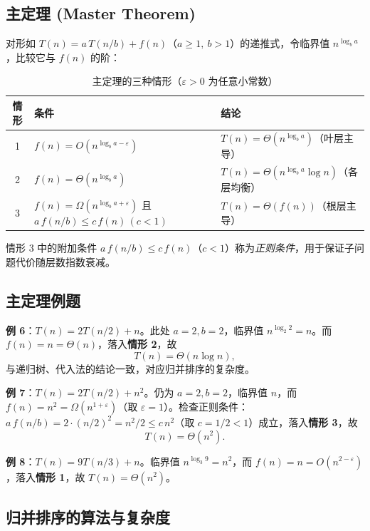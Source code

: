 \subsection{主定理 (Master Theorem)}

对形如 $T(n)=a\,T(n/b)+f(n)$（$a\ge1,\ b>1$）的递推式，令临界值 $n^{\log_b a}$，比较它与 $f(n)$ 的阶：

\begin{table}[H]
\centering
\caption{主定理的三种情形（$\varepsilon>0$ 为任意小常数）}
\label{tab:master}
\begin{tabularx}{\textwidth}{c l X}
\toprule
情形 & 条件 & 结论 \\
\midrule
1 & $f(n)=O(n^{\log_b a-\varepsilon})$ & $T(n)=\Theta(n^{\log_b a})$（叶层主导） \\
2 & $f(n)=\Theta(n^{\log_b a})$ & $T(n)=\Theta(n^{\log_b a}\log n)$（各层均衡） \\
3 & $f(n)=\Omega(n^{\log_b a+\varepsilon})$ 且 $a\,f(n/b)\le c\,f(n)\,(c<1)$ & $T(n)=\Theta(f(n))$（根层主导） \\
\bottomrule
\end{tabularx}
\end{table}

情形 3 中的附加条件 $a\,f(n/b)\le c\,f(n)$（$c<1$）称为\emph{正则条件}，用于保证子问题代价随层数指数衰减。

\subsection{主定理例题}

\textbf{例 6}：$T(n)=2T(n/2)+n$。此处 $a=2,b=2$，临界值 $n^{\log_2 2}=n$。而 $f(n)=n=\Theta(n)$，落入\textbf{情形 2}，故
\begin{equation}
T(n)=\Theta(n\log n),
\end{equation}
与递归树、代入法的结论一致，对应归并排序的复杂度。

\textbf{例 7}：$T(n)=2T(n/2)+n^2$。仍为 $a=2,b=2$，临界值 $n$，而 $f(n)=n^2=\Omega(n^{1+\varepsilon})$（取 $\varepsilon=1$）。检查正则条件：$a\,f(n/b)=2\cdot(n/2)^2=n^2/2\le c\,n^2$（取 $c=1/2<1$）成立，落入\textbf{情形 3}，故
\begin{equation}
T(n)=\Theta(n^2).
\end{equation}

\textbf{例 8}：$T(n)=9T(n/3)+n$。临界值 $n^{\log_3 9}=n^2$，而 $f(n)=n=O(n^{2-\varepsilon})$，落入\textbf{情形 1}，故 $T(n)=\Theta(n^2)$。

\subsection{归并排序的算法与复杂度}

